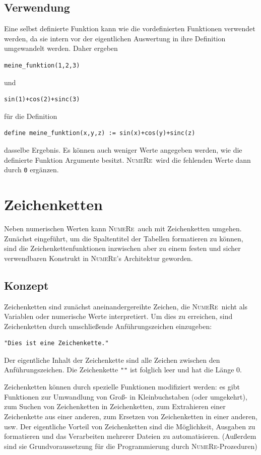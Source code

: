 \documentclass[DIV=14,headsepline,footsepline]{scrbook}
\newcommand{\NR}{\textsc{Nu\-me\-Re}}
\begin{document}
			\section{Verwendung}
				Eine selbst definierte Funktion kann wie die vordefinierten Funktionen verwendet werden, da sie intern vor der eigentlichen Auswertung in ihre Definition umgewandelt werden. Daher ergeben
				\begin{lstlisting}
meine_funktion(1,2,3)
				\end{lstlisting}
				und 
				\begin{lstlisting}
sin(1)+cos(2)+sinc(3)
				\end{lstlisting}
				für die Definition
				\begin{lstlisting}
define meine_funktion(x,y,z) := sin(x)+cos(y)+sinc(z)
				\end{lstlisting}
				dasselbe Ergebnis. Es können auch weniger Werte angegeben werden, wie die definierte Funktion Argumente besitzt. \NR\ wird die fehlenden Werte dann durch \lstinline+0+ ergänzen.
		\chapter{Zeichenketten}
			Neben numerischen Werten kann \NR\ auch mit Zeichenketten umgehen. Zunächst eingeführt, um die Spaltentitel der Tabellen formatieren zu können, sind die Zeichenkettenfunktionen inzwischen aber zu einem festen und sicher verwendbaren Konstrukt in \NR's Architektur geworden.
			\section{Konzept}
				Zeichenketten sind zunächst aneinandergereihte Zeichen, die \NR\ nicht als Variablen oder numerische Werte interpretiert. Um dies zu erreichen, sind Zeichenketten durch umschließende Anführungszeichen einzugeben:
				\begin{lstlisting}
"Dies ist eine Zeichenkette."
				\end{lstlisting}
				Der eigentliche Inhalt der Zeichenkette sind alle Zeichen zwischen den Anführungszeichen. Die Zeichenkette \lstinline+""+ ist folglich leer und hat die Länge 0.
				
				Zeichenketten können durch spezielle Funktionen modifiziert werden: es gibt Funktionen zur Umwandlung von Groß- in Kleinbuchstaben (oder umgekehrt), zum Suchen von Zeichenketten in Zeichenketten, zum Extrahieren einer Zeichenkette aus einer anderen, zum Ersetzen von Zeichenketten in einer anderen, usw. Der eigentliche Vorteil von Zeichenketten sind die Möglichkeit, Ausgaben zu formatieren und das Verarbeiten mehrerer Dateien zu automatisieren. (Außerdem sind sie Grundvoraussetzung für die Programmierung durch \NR-Prozeduren)
				
\end{document}
